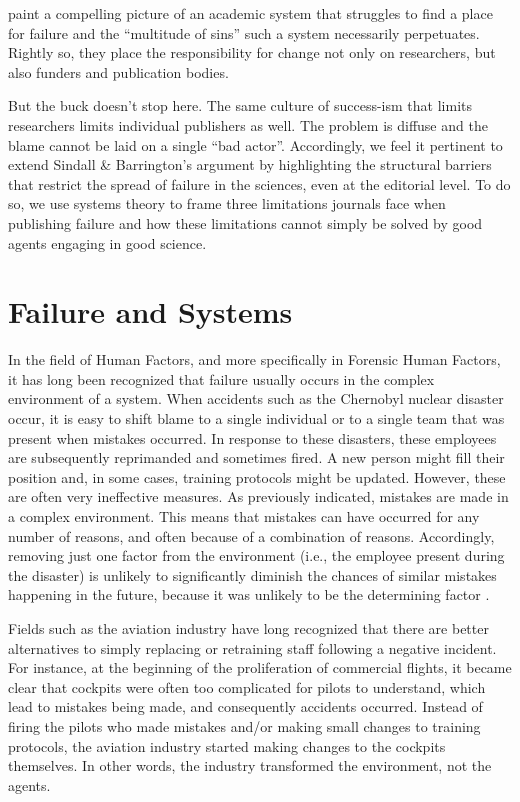 \documentclass[editorial, authordate,twocolumn,issue]{jote-new-article}
\begin{document}
\textcite{Sindall2020} paint a compelling picture of an academic system that struggles to find a place for failure and the “multitude of sins” such a system necessarily perpetuates. Rightly so, they place the responsibility for change not only on researchers, but also funders and publication bodies. 

But the buck doesn't stop here. The same culture of success-ism that limits researchers limits individual publishers as well. The problem is diffuse and the blame cannot be laid on a single “bad actor”. Accordingly, we feel it pertinent to extend Sindall \& Barrington's argument by highlighting the structural barriers that restrict the spread of failure in the sciences, even at the editorial level. To do so, we use systems theory to frame three limitations journals face when publishing failure and how these limitations cannot simply be solved by good agents engaging in good science. 



\section{Failure and Systems }

In the field of Human Factors, and more specifically in Forensic Human Factors, it has long been recognized that failure usually occurs in the complex environment of a system. When accidents such as the Chernobyl nuclear disaster occur, it is easy to shift blame to a single individual or to a single team that was present when mistakes occurred. In response to these disasters, these employees are subsequently reprimanded and sometimes fired. A new person might fill their position and, in some cases, training protocols might be updated. However, these are often very ineffective measures. As previously indicated, mistakes are made in a complex environment. This means that mistakes can have occurred for any number of reasons, and often because of a combination of reasons. Accordingly, removing just one factor from the environment (i.e., the employee present during the disaster) is unlikely to significantly diminish the chances of similar mistakes happening in the future, because it was unlikely to be the determining factor \parencite{Holden2009}. 

Fields such as the aviation industry have long recognized that there are better alternatives to simply replacing or retraining staff following a negative incident. For instance, at the beginning of the proliferation of commercial flights, it became clear that cockpits were often too complicated for pilots to understand, which lead to mistakes being made, and consequently accidents occurred. Instead of firing the pilots who made mistakes and/or making small changes to training protocols, the aviation industry started making changes to the cockpits themselves. In other words, the industry transformed the environment, not the agents.
\end{document}
